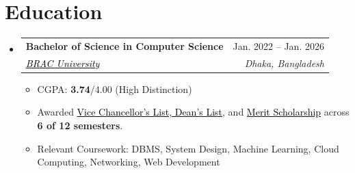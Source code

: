 \documentclass[a4paper]{article}
\makeatletter
\newcommand{\resumeItem}[1]{
  \item\small{
    {#1 \vspace{-2pt}}
  }
}
\newcommand{\resumeSubheading}[4]{
  \vspace{-2pt}\item
    \begin{tabular*}{0.97\textwidth}[t]{l@{\extracolsep{\fill}}r}
      \textbf{#1} & #2 \\
      \textit{\small#3} & \textit{\small #4} \\
    \end{tabular*}\vspace{-7pt}
}
\newcommand{\resumeSubHeadingListStart}{\begin{itemize}[leftmargin=0.15in, label={}]}
\newcommand{\resumeSubHeadingListEnd}{\end{itemize}}
\newcommand{\resumeItemListStart}{\begin{itemize}}
\newcommand{\resumeItemListEnd}{\end{itemize}\vspace{-5pt}}
\makeatother
\begin{document}
\section{Education}
  \resumeSubHeadingListStart
    \resumeSubheading
      {\textbf{Bachelor of Science in Computer Science}}{Jan. 2022 -- Jan. 2026}
{\href{https://www.bracu.ac.bd/}{\textcolor{black}{BRAC University}}}{Dhaka, Bangladesh}
      \resumeItemListStart
        \resumeItem{CGPA: \textbf{3.74}/4.00 (High Distinction)}
        \resumeItem{Awarded \href{https://www.bracu.ac.bd/academics/policies-and-procedures/academic-standings-and-honors}{\textcolor{black}{Vice Chancellor's List, Dean's List}}, and \href{https://www.bracu.ac.bd/admissions/international-applicants/scholarship-financial-aid}{\textcolor{black}{Merit Scholarship}} across \textbf{6 of 12 semesters}.}
        \resumeItem{Relevant Coursework: DBMS, System Design, Machine Learning, Cloud Computing, Networking, Web Development}
      \resumeItemListEnd
  \resumeSubHeadingListEnd




\end{document}
